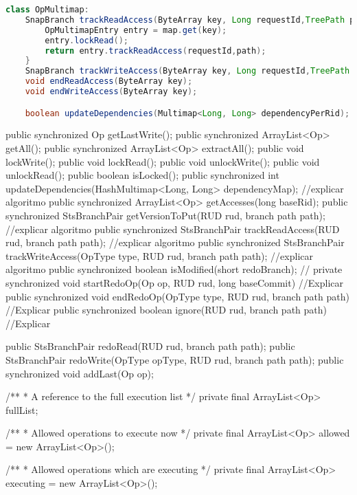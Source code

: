 \begin{minipage}{\textwidth}
\begin{lstlisting}[language=java,firstnumber=1,backgroundcolor=\color{grey},mathescape,caption={Class of the operations multimap (pseudo-code)},label={code:multimap}]
class OpMultimap:
	SnapBranch trackReadAccess(ByteArray key, Long requestId,TreePath path){
		OpMultimapEntry entry = map.get(key);
		entry.lockRead();
		return entry.trackReadAccess(requestId,path);
	}
	SnapBranch trackWriteAccess(ByteArray key, Long requestId,TreePath path);
	void endReadAccess(ByteArray key);
	void endWriteAccess(ByteArray key);

	boolean updateDependencies(Multimap<Long, Long> dependencyPerRid);
\end{lstlisting}
\end{minipage}

public synchronized Op getLastWrite();
public synchronized ArrayList<Op> getAll();
public synchronized ArrayList<Op> extractAll();
public void lockWrite();
public void lockRead();
public void unlockWrite();
public void unlockRead();
public boolean isLocked();
public synchronized int updateDependencies(HashMultimap<Long, Long> dependencyMap); //explicar algoritmo
public synchronized ArrayList<Op> getAccesses(long baseRid);
public synchronized StsBranchPair getVersionToPut(RUD rud, branch path path); //explicar algoritmo
public synchronized StsBranchPair trackReadAccess(RUD rud, branch path path); //explicar algoritmo
public synchronized StsBranchPair trackWriteAccess(OpType type, RUD rud, branch path path); //explicar algoritmo
public synchronized boolean isModified(short redoBranch); //
private synchronized void startRedoOp(Op op, RUD rud, long baseCommit) //Explicar
public synchronized void endRedoOp(OpType type, RUD rud, branch path path) //Explicar
public synchronized boolean ignore(RUD rud, branch path path) //Explicar

public StsBranchPair redoRead(RUD rud, branch path path);
public StsBranchPair redoWrite(OpType opType, RUD rud, branch path path);
public synchronized void addLast(Op op);



/**
    * A reference to the full execution list
    */
   private final ArrayList<Op> fullList;

   /**
    * Allowed operations to execute now
    */
   private final ArrayList<Op> allowed = new ArrayList<Op>();

   /**
    * Allowed operations which are executing
    */
   private final ArrayList<Op> executing = new ArrayList<Op>();

